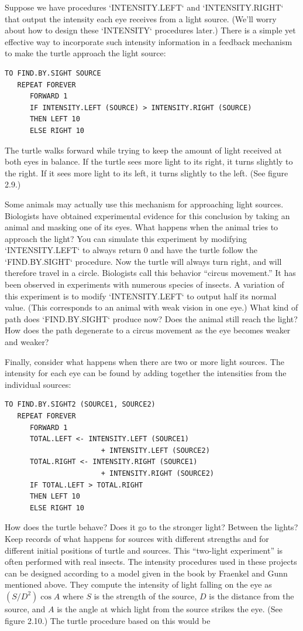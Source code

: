 \documentclass{book}
\begin{document}
Suppose we have procedures \textsc{`INTENSITY.LEFT`} and \textsc{`INTENSITY.RIGHT`}
that output the intensity each eye receives from a light source. (We'll
worry about how to design these \textsc{`INTENSITY`} procedures later.) There is
a simple yet effective way to incorporate such intensity information in a
feedback mechanism to make the turtle approach the light source:

\begin{verbatim}
TO FIND.BY.SIGHT SOURCE
   REPEAT FOREVER
      FORWARD 1
      IF INTENSITY.LEFT (SOURCE) > INTENSITY.RIGHT (SOURCE)
      THEN LEFT 10
      ELSE RIGHT 10
\end{verbatim}
The turtle walks forward while trying to keep the amount of light
received at both eyes in balance. If the turtle sees more light to its
right, it turns slightly to the right. If it sees more light to its left, it
turns slightly to the left. (See figure 2.9.)

Some animals may actually use this mechanism for approaching light
sources. Biologists have obtained experimental evidence for this conclusion by taking an animal and masking one of its eyes. What happens
when the animal tries to approach the light? You can simulate this experiment by modifying \textsc{`INTENSITY.LEFT`} to always return 0 and have
the turtle follow the \textsc{`FIND.BY.SIGHT`} procedure. Now the turtle will always turn right, and will therefore travel in a circle. Biologists call this
behavior ``circus movement.'' It has been observed in experiments with
numerous species of insects.
A variation of this experiment is to modify \textsc{`INTENSITY.LEFT`} to output
half its normal value. (This corresponds to an animal with weak vision
in one eye.) What kind of path does \textsc{`FIND.BY.SIGHT`} produce now? Does
the animal still reach the light? How does the path degenerate to a circus
movement as the eye becomes weaker and weaker?

Finally, consider what happens when there are two or more light
sources. The intensity for each eye can be found by adding together
the intensities from the individual sources:

\begin{verbatim}
TO FIND.BY.SIGHT2 (SOURCE1, SOURCE2)
   REPEAT FOREVER
      FORWARD 1
      TOTAL.LEFT <- INTENSITY.LEFT (SOURCE1)
                       + INTENSITY.LEFT (SOURCE2) 
      TOTAL.RIGHT <- INTENSITY.RIGHT (SOURCE1)
                       + INTENSITY.RIGHT (SOURCE2)
      IF TOTAL.LEFT > TOTAL.RIGHT
      THEN LEFT 10
      ELSE RIGHT 10
\end{verbatim}
How does the turtle behave? Does it go to the stronger light? Between
the lights? Keep records of what happens for sources with different
strengths and for different initial positions of turtle and sources. This
``two-light experiment'' is often performed with real insects.
The intensity procedures used in these projects can be designed according to a model given in the book by Fraenkel and Gunn mentioned above.
They compute the intensity of light falling on the eye as $(S/D^2)\cos A$
where $S$ is the strength of the source, $D$ is the distance from the source,
and $A$ is the angle at which light from the source strikes the eye. (See
figure 2.10.) The turtle procedure based on this would be
\end{document}
